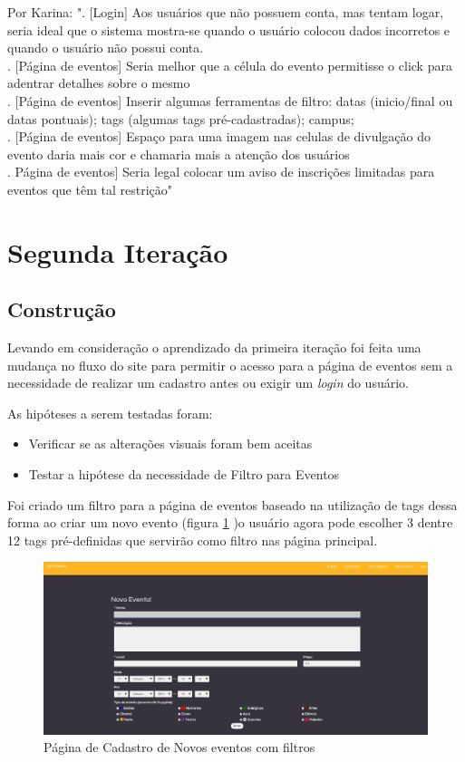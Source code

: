 \begin{itemize}
\par Por Karina: ". [Login] Aos usuários que não possuem conta, mas tentam logar, seria ideal que o sistema mostra-se quando o usuário colocou dados incorretos e quando o usuário não possui conta. 
\\
. [Página de eventos] Seria melhor que a célula do evento permitisse o click para adentrar detalhes sobre o mesmo
\\
. [Página de eventos] Inserir algumas ferramentas de filtro: datas (inicio/final ou datas pontuais); tags (algumas tags pré-cadastradas); campus;
\\
. [Página de eventos] Espaço para uma imagem nas celulas de divulgação do evento daria mais cor e chamaria mais a atenção dos usuários
\\
. Página de eventos] Seria legal colocar um aviso de inscrições limitadas para eventos que têm tal restrição"

\end{itemize}
\section{Segunda Iteração}
\subsection{Construção}
\par Levando em consideração o aprendizado da primeira iteração foi feita uma mudança no fluxo do site para permitir o acesso para a página de eventos sem a necessidade de realizar um cadastro antes ou exigir um \emph{login} do usuário.
\par As hipóteses a serem testadas foram:
\begin{itemize}
\item Verificar se as alterações visuais foram bem aceitas
\item Testar a hipótese da necessidade de Filtro para Eventos
\end{itemize}
\par Foi criado um filtro para a página de eventos baseado na utilização de tags dessa forma ao criar um novo evento (figura \ref{fig:event_newv2} )o usuário agora pode escolher 3 dentre 12 tags pré-definidas que servirão como filtro nas página principal.
        \begin{figure}[htb]
		\includegraphics[width=15cm]{figuras/event_newv2}
		\caption{\label{fig:event_newv2} Página de Cadastro de Novos eventos com filtros}
		\end{figure} 

